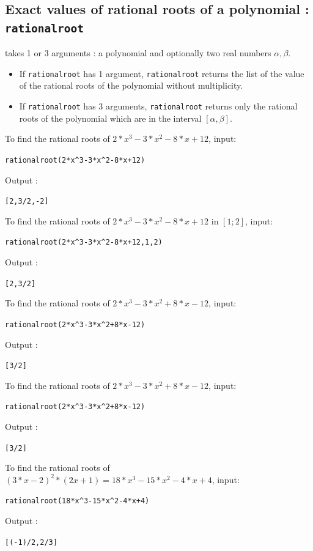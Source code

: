 \documentclass[a4paper,11pt]{book}
\begin{document}
\subsection{Exact values of rational roots of a polynomial :
{\tt rationalroot}}
 takes 1 or 3 arguments : a polynomial and  
optionally two real numbers $\alpha,\beta$.
\begin{itemize}
\item If {\tt rationalroot} has 1 argument, {\tt rationalroot} returns the list
of the value of the  rational roots of the polynomial without multiplicity.
\item If {\tt rationalroot} has 3 arguments, {\tt rationalroot} returns only 
the rational roots of the polynomial which are in the interval 
$[\alpha,\beta]$.
\end{itemize}
To find the rational roots of $2*x^3-3*x^2-8*x+12$, input:
\begin{center}{\tt rationalroot(2*x\verb|^|3-3*x\verb|^|2-8*x+12)}\end{center}
Output :
\begin{center}{\tt [2,3/2,-2]}\end{center} 
To find the rational roots of $2*x^3-3*x^2-8*x+12$ in $[1;2]$, input:
\begin{center}{\tt rationalroot(2*x\verb|^|3-3*x\verb|^|2-8*x+12,1,2)}\end{center}
Output :
\begin{center}{\tt [2,3/2]}\end{center} 
To find the rational roots of $2*x^3-3*x^2+8*x-12$, input:
\begin{center}{\tt rationalroot(2*x\verb|^|3-3*x\verb|^|2+8*x-12)}\end{center}
Output :
\begin{center}{\tt [3/2]}\end{center} 
To find the rational roots of $2*x^3-3*x^2+8*x-12$, input:
\begin{center}{\tt rationalroot(2*x\verb|^|3-3*x\verb|^|2+8*x-12)}\end{center}
Output :
\begin{center}{\tt [3/2]}\end{center} 
To find the rational roots of $(3*x-2)^2*(2x+1)=18*x^3-15*x^2-4*x+4$, input:
\begin{center}{\tt rationalroot(18*x\verb|^|3-15*x\verb|^|2-4*x+4)}\end{center}
Output :
\begin{center}{\tt [(-1)/2,2/3]}\end{center} 
\end{document}
